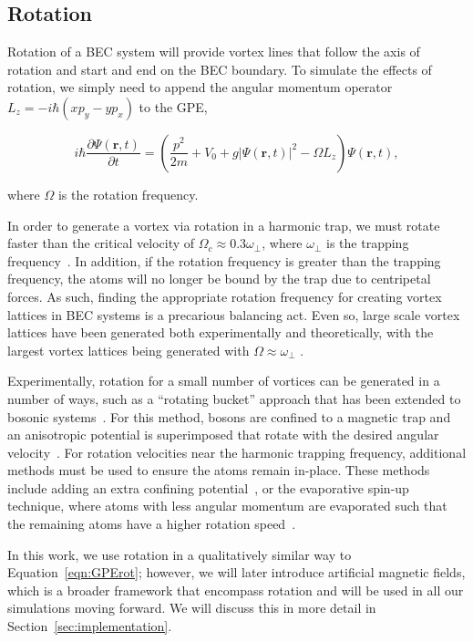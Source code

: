 \subsection{Rotation}

\label{sec:rot}
Rotation of a BEC system will provide vortex lines that follow the axis of rotation and start and end on the BEC boundary.
To simulate the effects of rotation, we simply need to append the angular momentum operator $L_z = -i\hbar(xp_y - yp_x)$ to the GPE,

\begin{equation}
i \hbar \frac{\partial \Psi(\mathbf{r},t)}{\partial t} = \left(\frac{p^2}{2m} + V_0 + g |\Psi(\mathbf{r},t)|^2 -\Omega L_z \right)\Psi(\mathbf{r},t),
\label{eqn:GPErot}
\end{equation}

\noindent where $\Omega$ is the rotation frequency. 

In order to generate a vortex via rotation in a harmonic trap, we must rotate faster than the critical velocity of $\Omega_c \approx 0.3 \omega_\perp$, where $\omega_\perp$ is the trapping frequency~.
In addition, if the rotation frequency is greater than the trapping frequency, the atoms will no longer be bound by the trap due to centripetal forces.
As such, finding the appropriate rotation frequency for creating vortex lattices in BEC systems is a precarious balancing act.
Even so, large scale vortex lattices have been generated both experimentally and theoretically, with the largest vortex lattices being generated with $\Omega \approx \omega_\perp$ \cite{o2016, o2016topo, abo2001, schweikhard2004}.

Experimentally, rotation for a small number of vortices can be generated in a number of ways, such as a ``rotating bucket'' approach that has been extended to bosonic systems~\cite{chevy2006}.
For this method, bosons are confined to a magnetic trap and an anisotropic potential is superimposed that rotate with the desired angular velocity~\cite{madison2000,abo2001,hodby2001,haljan2001}.
For rotation velocities near the harmonic trapping frequency, additional methods must be used to ensure the atoms remain in-place.
These methods include adding an extra confining potential~\cite{bretin2004}, or the evaporative spin-up technique, where atoms with less angular momentum are evaporated such that the remaining atoms have a higher rotation speed~\cite{schweikhard2004,engels2003}.


In this work, we use rotation in a qualitatively similar way to Equation~\eqref{eqn:GPErot}; however, we will later introduce artificial magnetic fields, which is a broader framework that encompass rotation and will be used in all our simulations moving forward.
We will discuss this in more detail in Section~\ref{sec:implementation}.

